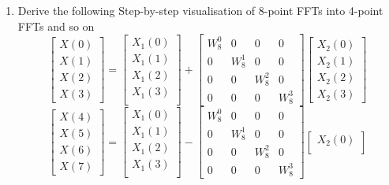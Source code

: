 \documentclass[journal,12pt,twocolumn]{IEEEtran}
\renewcommand\thesection{\arabic{section}}
\begin{document}
\begin{enumerate}[label=\arabic*.,ref=\thesection.\theenumi]
	\item Derive the following Step-by-step visualisation  of
	8-point FFTs into 4-point FFTs and so on
	\begin{equation}
		\begin{bmatrix}
			X(0) \\ 
			X(1) \\ 
			X(2) \\ 
			X(3)
		\end{bmatrix}
		=
		\begin{bmatrix}
			X_{1}(0) \\ 
			X_{1}(1)\\ 
			X_{1}(2)\\
			X_{1}(3)\\
		\end{bmatrix}
		+
		\begin{bmatrix}
			W^{0}_{8} & 0 & 0 & 0\\
			0 & W^{1}_{8} & 0 & 0\\
			0 & 0 & W^{2}_{8} & 0\\
			0 & 0 & 0 & W^{3}_{8}
		\end{bmatrix}
		\begin{bmatrix}
			X_{2}(0) \\ 
			X_{2}(1) \\ 
			X_{2}(2) \\
			X_{2}(3)
		\end{bmatrix}
	\end{equation}
	\begin{equation}
		\begin{bmatrix}
			X(4) \\ 
			X(5) \\ 
			X(6) \\ 
			X(7)
		\end{bmatrix}
		=
		\begin{bmatrix}
			X_{1}(0) \\ 
			X_{1}(1)\\ 
			X_{1}(2)\\
			X_{1}(3)\\
		\end{bmatrix}
		-
		\begin{bmatrix}
			W^{0}_{8} & 0 & 0 & 0\\
			0 & W^{1}_{8} & 0 & 0\\
			0 & 0 & W^{2}_{8} & 0\\
			0 & 0 & 0 & W^{3}_{8}
		\end{bmatrix}
		\begin{bmatrix}
			X_{2}(0) \\ 

\end{bmatrix}
\end{equation}
\end{enumerate}
\end{document}
